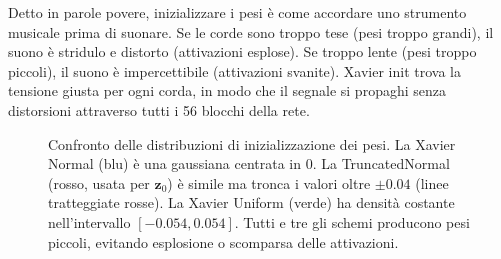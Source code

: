 \documentclass[12pt,a4paper]{article}
\begin{document}
\begin{notabox}
Detto in parole povere, inizializzare i pesi \`e come accordare uno strumento musicale prima di suonare. Se le corde sono troppo tese (pesi troppo grandi), il suono \`e stridulo e distorto (attivazioni esplose). Se troppo lente (pesi troppo piccoli), il suono \`e impercettibile (attivazioni svanite). Xavier init trova la tensione giusta per ogni corda, in modo che il segnale si propaghi senza distorsioni attraverso tutti i 56 blocchi della rete.
\end{notabox}

\begin{figure}[H]
\centering
{}
\caption{Confronto delle distribuzioni di inizializzazione dei pesi. La Xavier Normal (blu) \`e una gaussiana centrata in 0. La TruncatedNormal (rosso, usata per $\mathbf{z}_0$) \`e simile ma tronca i valori oltre $\pm 0.04$ (linee tratteggiate rosse). La Xavier Uniform (verde) ha densit\`a costante nell'intervallo $[-0.054, 0.054]$. Tutti e tre gli schemi producono pesi piccoli, evitando esplosione o scomparsa delle attivazioni.}
\label{fig:weight_init_distributions}
\end{figure}
\end{document}
